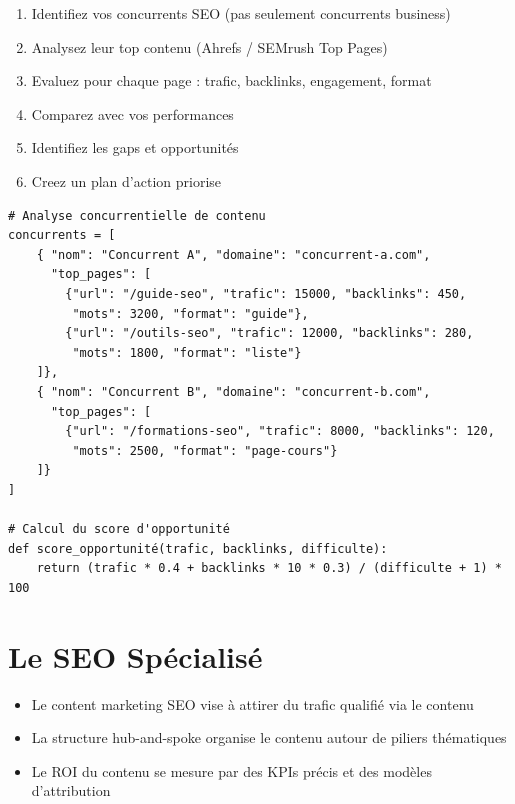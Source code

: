\documentclass[12pt,a4paper,twoside]{report}
\begin{document}
\begin{enumerate}
    \item Identifiez vos concurrents SEO (pas seulement concurrents business)
    \item Analysez leur top contenu (Ahrefs / SEMrush Top Pages)
    \item Evaluez pour chaque page : trafic, backlinks, engagement, format
    \item Comparez avec vos performances
    \item Identifiez les gaps et opportunités
    \item Creez un plan d'action priorise
\end{enumerate}

\begin{lstlisting}[style=code,caption={Structure d'analyse concurrentielle (tableau de benchmark)}]
# Analyse concurrentielle de contenu
concurrents = [
    { "nom": "Concurrent A", "domaine": "concurrent-a.com",
      "top_pages": [
        {"url": "/guide-seo", "trafic": 15000, "backlinks": 450,
         "mots": 3200, "format": "guide"},
        {"url": "/outils-seo", "trafic": 12000, "backlinks": 280,
         "mots": 1800, "format": "liste"}
    ]},
    { "nom": "Concurrent B", "domaine": "concurrent-b.com",
      "top_pages": [
        {"url": "/formations-seo", "trafic": 8000, "backlinks": 120,
         "mots": 2500, "format": "page-cours"}
    ]}
]

# Calcul du score d'opportunité
def score_opportunité(trafic, backlinks, difficulte):
    return (trafic * 0.4 + backlinks * 10 * 0.3) / (difficulte + 1) * 100
\end{lstlisting}



\part{Le SEO Spécialisé}
\label{part:specialise}

\begin{takeaways}
\begin{itemize}
    \item Le content marketing SEO vise à attirer du trafic qualifié via le contenu
    \item La structure hub-and-spoke organise le contenu autour de piliers thématiques
    \item Le ROI du contenu se mesure par des KPIs précis et des modèles d'attribution
\end{itemize}
\end{takeaways}
\end{document}
